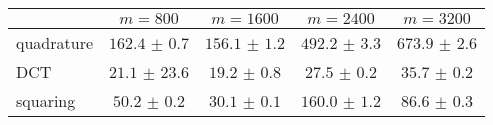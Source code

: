 \centering
\renewcommand{\arraystretch}{1.2}
\begin{tabular}{@{}lcccc@{}}
\toprule
 & $m=800$ & $m=1600$ & $m=2400$ & $m=3200$\\
\midrule
quadrature & $162.4$ $\pm$ $0.7$ & $156.1$ $\pm$ $1.2$ & $492.2$ $\pm$ $3.3$ & $673.9$ $\pm$ $2.6$ \\
DCT & $21.1$ $\pm$ $23.6$ & $19.2$ $\pm$ $0.8$ & $27.5$ $\pm$ $0.2$ & $35.7$ $\pm$ $0.2$ \\
squaring & $50.2$ $\pm$ $0.2$ & $30.1$ $\pm$ $0.1$ & $160.0$ $\pm$ $1.2$ & $86.6$ $\pm$ $0.3$ \\
\bottomrule
\end{tabular}
